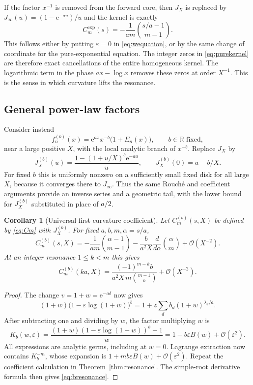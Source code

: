 \documentclass[11pt,a4paper]{article}
\numberwithin{equation}{section}
\newtheorem{corollary}[theorem]{Corollary}
\theoremstyle{definition}
\theoremstyle{remark}
\newcommand{\R}{\mathbb R}
\newcommand{\ee}{\mathrm e}
\newcommand{\bigO}{\mathcal O}
\newcommand{\eps}{\varepsilon}
\begin{document}
If the factor $x^{-1}$ is removed from the forward core, then
$J_X$ is replaced by $J_\infty(u)=(1-\ee^{-au})/u$ and the kernel is
exactly
\begin{equation}
 C_m^{\mathrm{exp}}(s)=-\frac1{am}\binom{s/a-1}{m-1}.
 \label{eq:purekernel}
\end{equation}
This follows either by putting $\eps=0$ in \eqref{eq:wequation},
or by the same change of coordinate for the pure-exponential equation.
The integer zeros in \eqref{eq:purekernel} are therefore exact
cancellations of the entire homogeneous kernel. The logarithmic term
in the phase $ax-\log x$ removes these zeros at order $X^{-1}$.
This is the sense in which curvature lifts the resonance.

\subsection{General power-law factors}

Consider instead
\begin{equation}
 f_n^{(b)}(x)=\ee^{ax}x^{-b}\bigl(1+E_n(x)\bigr),
 \qquad b\in\R\text{ fixed},
 \label{eq:bcore}
\end{equation}
near a large positive $X$, with the local analytic branch of $x^{-b}$.
Replace $J_X$ by
\begin{equation}
 J_X^{(b)}(u)=\frac{1-(1+u/X)^b\ee^{-au}}u,
 \qquad J_X^{(b)}(0)=a-b/X.
 \label{eq:Jb}
\end{equation}
For fixed $b$ this is uniformly nonzero on a sufficiently small fixed
disk for all large $X$, because it converges there to $J_\infty$.
Thus the same Rouch\'e and coefficient arguments provide an inverse
series and a geometric tail, with the lower bound for $J_X^{(b)}$
substituted in place of $a/2$.

\begin{corollary}[Universal first curvature coefficient]
\label{cor:bcore}
Let $C_m^{(b)}(s,X)$ be defined by \eqref{eq:Cm} with $J_X^{(b)}$.
For fixed $a,b,m,\alpha=s/a$,
\begin{equation}
 C_m^{(b)}(s,X)=
 -\frac1{am}\binom{\alpha-1}{m-1}
 -\frac{b}{a^2X}\frac{d}{d\alpha}\binom{\alpha}{m}
 +\bigO(X^{-2}).
 \label{eq:bexpansion}
\end{equation}
At an integer resonance $1\le k<m$ this gives
\begin{equation}
 C_m^{(b)}(ka,X)=
 \frac{(-1)^{m-k}b}{a^2X\,m\binom{m-1}{k}}
 +\bigO(X^{-2}).
 \label{eq:bresonance}
\end{equation}
\end{corollary}
\begin{proof}
The change $v=1+w=\ee^{-a\delta}$ now gives
\[
 (1+w)\bigl(1-\eps\log(1+w)\bigr)^b
 =1+z\sum_d b_d(1+w)^{\lambda_d/a}.
\]
After subtracting one and dividing by $w$, the factor multiplying $w$
is
\[
 K_b(w,\eps)=
 \frac{(1+w)(1-\eps\log(1+w))^b-1}{w}
 =1-b\eps B(w)+\bigO(\eps^2).
\]
All expressions are analytic germs, including at $w=0$.
Lagrange extraction now contains $K_b^{-m}$, whose expansion is
$1+mb\eps B(w)+\bigO(\eps^2)$. Repeat the coefficient calculation
in Theorem~\ref{thm:resonance}. The simple-root derivative formula
then gives \eqref{eq:bresonance}.
\end{proof}
\end{document}
